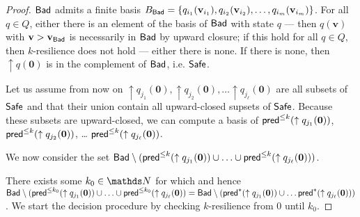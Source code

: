 \begin{proof}
$\textsf{Bad}$ admits a finite basis 
$B_{\textsf{Bad}} = \{ q_{i_1}(\textbf{v}_{i_1}), q_{i_2}(\textbf{v}_{i_2}), \ldots,
q_{i_m}(\textbf{v}_{i_m}) \}$.
For all $q \in Q$, either there is an element of the basis of $\textsf{Bad}$ with state $q$ \----
then $q(\textbf{v})$ with $\textbf{v} > \textbf{v}_{\textsf{Bad}}$ is necessarily in $\textsf{Bad}$ by upward closure; if this hold for all $q \in Q$, then $k$-resilience does not hold \---- either there is none. If there is none, then 
$\uparrow q(\textbf{0})$
 is in the complement of $\textsf{Bad}$, i.e. $\textsf{Safe}$.

Let us assume from now on 
 $\uparrow q_{j_1}(\textbf{0}), \uparrow q_{j_2}(\textbf{0}), \ldots \uparrow q_{j_\ell}(\textbf{0})$ are
all subsets of $\textsf{Safe}$ and that their union contain all upward-closed supsets of $\textsf{Safe}$.
Because these subsets are upward-closed, we can compute a basis of
$\textsf{pred}^{\leq k}(\uparrow q_{j_1}(\textbf{0}))$, $\textsf{pred}^{\leq k}(\uparrow q_{j_2}(\textbf{0}))$, \ldots
$\textsf{pred}^{\leq k}(\uparrow q_{j_\ell}(\textbf{0}))$.


We now consider the set 
$\textsf{Bad} \setminus (\textsf{pred}^{\leq k}(\uparrow q_{j_1}(\textbf{0})) \cup \ldots \cup \textsf{pred}^{\leq k}(\uparrow q_{j_\ell}(\textbf{0})) )$.



There exists some $k_0 \in \N$ for which
and hence
$\textsf{Bad} \setminus (\textsf{pred}^{\leq k_0}(\uparrow q_{j_1}(\textbf{0}))\cup \ldots \cup \textsf{pred}^{\leq k_0}(\uparrow q_{j_\ell}(\textbf{0}))= 
\textsf{Bad} \setminus (\textsf{pred}^{*}(\uparrow q_{j_1}(\textbf{0})) \cup \ldots \textsf{pred}^{*}(\uparrow q_{j_\ell}(\textbf{0})) )$.
We start the decision procedure by checking {\sc $k$-resilience} from $0$ until $k_0$.


\end{proof}

